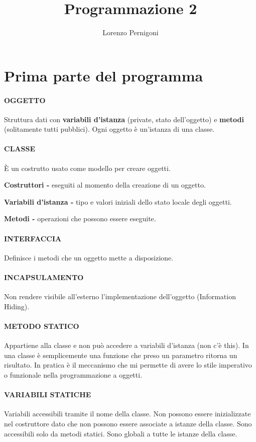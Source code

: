 \documentclass[a4paper, 12pt]{article}
\title{\centering \textbf{Programmazione 2}}
\author{Lorenzo Pernigoni}
\date{}
\begin{document}
\maketitle
\clearpage
\section{Prima parte del programma}
\paragraph{OGGETTO}
Struttura dati con \textbf{variabili d'istanza} (private, stato 
dell'oggetto) e \textbf{metodi} (solitamente tutti pubblici). Ogni oggetto è un'istanza di
una classe.

\paragraph{CLASSE} 
È un costrutto usato come modello per creare oggetti. 

\textbf{Costruttori -} eseguiti al momento della creazione di un oggetto.

\textbf{Variabili d'istanza -} tipo e valori iniziali dello stato locale degli oggetti.

\textbf{Metodi -} operazioni che possono essere eseguite.

\paragraph{INTERFACCIA}
Definisce i metodi che un oggetto mette a disposizione.

\paragraph{INCAPSULAMENTO}
Non rendere visibile all'esterno l'implementazione dell'oggetto (Information Hiding).

\paragraph{METODO STATICO}
Appartiene alla classe e non può accedere a variabili d'istanza (non c'è this).
In una classe è semplicemente una funzione che preso un parametro ritorna un risultato.
In pratica è il meccanismo che mi permette di avere lo stile imperativo o funzionale nella
programmazione a oggetti.

\paragraph{VARIABILI STATICHE}
Variabili accessibili tramite il nome della classe. Non possono essere inizializzate
nel costruttore dato che non possono essere associate a istanze della classe.
Sono accessibili solo da metodi statici. Sono globali a tutte le istanze della classe.
\end{document}
